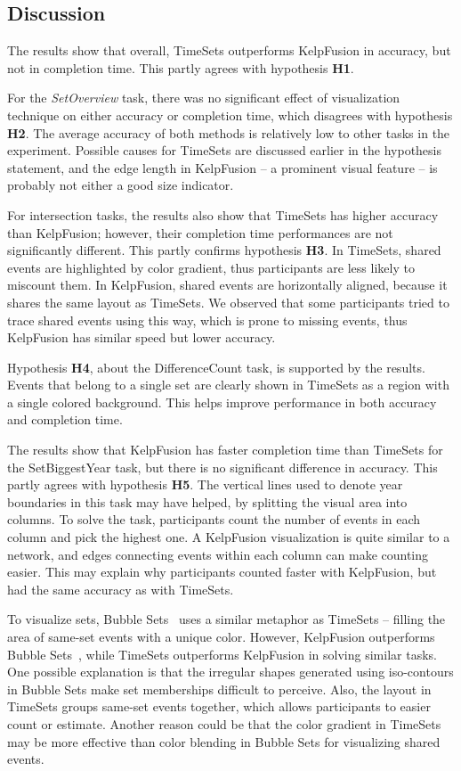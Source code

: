 \subsection{Discussion}
The results show that overall, TimeSets outperforms KelpFusion in accuracy, but not in completion time. This partly agrees with hypothesis \textbf{H1}.

For the \emph{SetOverview} task, there was no significant effect of visualization technique on either accuracy or completion time, which disagrees with hypothesis \textbf{H2}. The average accuracy of both methods is relatively low to other tasks in the experiment. Possible causes for TimeSets are discussed earlier in the hypothesis statement, and the edge length in KelpFusion -- a prominent visual feature -- is probably not either a good size indicator.

For intersection tasks, the results also show that TimeSets has higher accuracy than KelpFusion; however, their completion time performances are not significantly different. This partly confirms hypothesis \textbf{H3}. In TimeSets, shared events are highlighted by color gradient, thus participants are less likely to miscount them. In KelpFusion, shared events are horizontally aligned, because it shares the same layout as TimeSets. We observed that some participants tried to trace shared events using this way, which is prone to missing events, thus KelpFusion has similar speed but lower accuracy.

Hypothesis \textbf{H4}, about the DifferenceCount task, is supported by the results. Events that belong to a single set are clearly shown in TimeSets as a region with a single colored background. This helps improve performance in both accuracy and completion time.

The results show that KelpFusion has faster completion time than TimeSets for the SetBiggestYear task, but there is no significant difference in accuracy. This partly agrees with hypothesis \textbf{H5}. The vertical lines used to denote year boundaries in this task may have helped, by splitting the visual area into columns. To solve the task, participants count the number of events in each column and pick the highest one. A KelpFusion visualization is quite similar to a network, and edges connecting events within each column can make counting easier. This may explain why participants counted faster with KelpFusion, but had the same accuracy as with TimeSets.

To visualize sets, Bubble Sets~\cite{Collins2009a} uses a similar metaphor as TimeSets -- filling the area of same-set events with a unique color. However, KelpFusion outperforms Bubble Sets~\cite{Meulemans2013}, while TimeSets outperforms KelpFusion in solving similar tasks. One possible explanation is that the irregular shapes generated using iso-contours in Bubble Sets make set memberships difficult to perceive. Also, the layout in TimeSets groups same-set events together, which allows participants to easier count or estimate. Another reason could be that the color gradient in TimeSets may be more effective than color blending in Bubble Sets for visualizing shared events.

